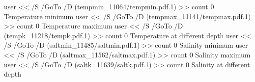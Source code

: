 \documentclass[a4paper,12pt]{article}
\newcommand*{\bookmark}[3][0]{%
  \pdfoutline user {<< /S /GoTo /D (#3) >>} count #1 {#2}}
\begin{document}
\bookmark[0]{Temperature minimum}{tempmin_11064/tempmin.pdf.1}
\bookmark[0]{Temperature maximum}{tempmax_11141/tempmax.pdf.1}
\bookmark[0]{Temperature at different depth}{tempk_11218/tempk.pdf.1}
\bookmark[0]{Salinity minimum}{saltmin_11485/saltmin.pdf.1}
\bookmark[0]{Salinity maximum}{saltmax_11562/saltmax.pdf.1}
\bookmark[0]{Salinity at different depth}{saltk_11639/saltk.pdf.1}
\end{document}
